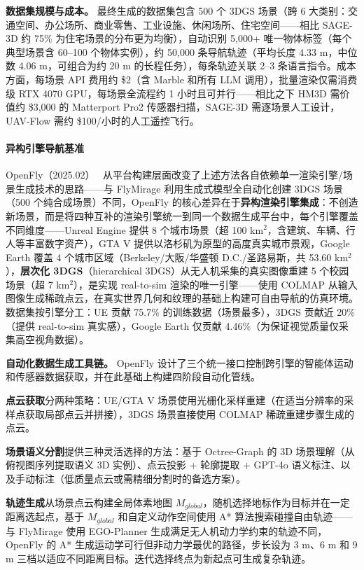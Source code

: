 \textbf{数据集规模与成本。}
最终生成的数据集包含 500 个 3DGS 场景（跨 6 大类别：交通空间、办公场所、商业零售、工业设施、休闲场所、住宅空间——相比 SAGE-3D 约 75\% 为住宅场景的分布更为均衡），自动识别 5,000+ 唯一物体标签（每个典型场景含 60--100 个物体实例），约 50,000 条导航轨迹（平均长度 4.33 m，中位数 4.06 m，可组合为约 20 m 的长程任务），每条轨迹关联 2--3 条语言指令。成本方面，每场景 API 费用约 \$2（含 Marble 和所有 LLM 调用），批量渲染仅需消费级 RTX 4070 GPU，每场景全流程约 1 小时且可并行——相比之下 HM3D 需价值约 \$3,000 的 Matterport Pro2 传感器扫描，SAGE-3D 需逐场景人工设计，UAV-Flow 需约 \$100/小时的人工遥控飞行。

\paragraph{异构引擎导航基准}

OpenFly（2025.02）~\cite{2502_18041} 从平台构建层面改变了上述方法各自依赖单一渲染引擎/场景生成技术的思路——与 FlyMirage 利用生成式模型全自动化创建 3DGS 场景（500 个纯合成场景）不同，OpenFly 的核心差异在于\textbf{异构渲染引擎集成}：不创造新场景，而是将四种互补的渲染引擎统一到同一个数据生成平台中，每个引擎覆盖不同维度——Unreal Engine 提供 8 个城市场景（超 100 km$^2$，含建筑、车辆、行人等丰富数字资产），GTA V 提供以洛杉矶为原型的高度真实城市景观，Google Earth 覆盖 4 个城市区域（Berkeley/大阪/华盛顿 D.C./圣路易斯，共 53.60 km$^2$），\textbf{层次化 3DGS}（hierarchical 3DGS）从无人机采集的真实图像重建 5 个校园场景（超 7 km$^2$），是实现 real-to-sim 渲染的唯一引擎——使用 COLMAP 从输入图像生成稀疏点云，在真实世界几何和纹理的基础上构建可自由导航的仿真环境。数据集按引擎分工：UE 贡献 75.7\% 的训练数据（场景最多），3DGS 贡献近 20\%（提供 real-to-sim 真实感），Google Earth 仅贡献 4.46\%（为保证视觉质量仅采集高空视角数据）。

\textbf{自动化数据生成工具链。}
OpenFly 设计了三个统一接口控制跨引擎的智能体运动和传感器数据获取，并在此基础上构建四阶段自动化管线。

\textbf{点云获取}分两种策略：UE/GTA V 场景使用光栅化采样重建（在适当分辨率的采样点获取局部点云并拼接），3DGS 场景直接使用 COLMAP 稀疏重建步骤生成的点云。

\textbf{场景语义分割}提供三种灵活选择的方法：基于 Octree-Graph 的 3D 场景理解（从俯视图序列提取语义 3D 实例）、点云投影 + 轮廓提取 + GPT-4o 语义标注、以及手动标注（低质量点云或需精细分割时的备选方案）。

\textbf{轨迹生成}从场景点云构建全局体素地图 $M_{global}$，随机选择地标作为目标并在一定距离选起点，基于 $M_{global}$ 和自定义动作空间使用 A* 算法搜索碰撞自由轨迹——与 FlyMirage 使用 EGO-Planner 生成满足无人机动力学约束的轨迹不同，OpenFly 的 A* 生成运动学可行但非动力学最优的路径，步长设为 3 m、6 m 和 9 m 三档以适应不同距离目标。迭代选择终点为新起点可生成复杂轨迹。

